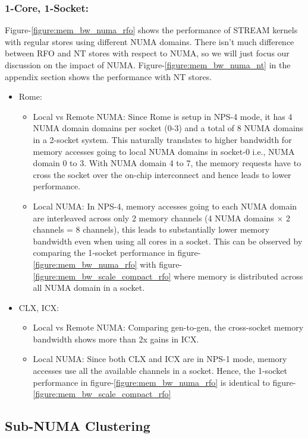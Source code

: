 \documentclass{article}
\begin{document}
\subsubsection{1-Core, 1-Socket:}
Figure-\ref{figure:mem_bw_numa_rfo} shows the performance of STREAM kernels with regular stores using different NUMA domains. There isn't much difference between RFO and NT stores with respect to NUMA, so we will just focus our discussion on the impact of NUMA. Figure-\ref{figure:mem_bw_numa_nt} in the appendix section shows the performance with NT stores.
\begin{itemize}
\item Rome:
\begin{itemize}
\item Local vs Remote NUMA: Since Rome is setup in NPS-4 mode, it has 4 NUMA domain domains per socket (0-3) and a total of 8 NUMA domains in a 2-socket system. This naturally translates to higher bandwidth for memory accesses going to local NUMA domains in socket-0 i.e., NUMA domain 0 to 3. With NUMA domain 4 to 7, the memory requests have to cross the socket over the on-chip interconnect and hence leads to lower performance.
\item Local NUMA: In NPS-4, memory accesses going to each NUMA domain are interleaved across only 2 memory channels (4 NUMA domains $\times$ 2 channels = 8 channels), this leads to substantially lower memory bandwidth even when using all cores in a socket. This can be observed by comparing the 1-socket performance in figure-\ref{figure:mem_bw_numa_rfo} with figure-\ref{figure:mem_bw_scale_compact_rfo} where memory is distributed across all NUMA domain in a socket.
\end{itemize}

\item CLX, ICX:
\begin{itemize}
\item Local vs Remote NUMA: Comparing gen-to-gen, the cross-socket memory bandwidth shows more than 2x gains in ICX.
\item Local NUMA: Since both CLX and ICX are in NPS-1 mode, memory accesses use all the available channels in a socket. Hence, the 1-socket performance in figure-\ref{figure:mem_bw_numa_rfo} is identical to figure-\ref{figure:mem_bw_scale_compact_rfo}
\end{itemize}
\end{itemize}


\clearpage
\subsection{Sub-NUMA Clustering} \label{snc}
\end{document}
